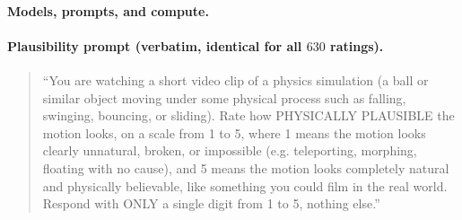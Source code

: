 \documentclass[10pt,twocolumn,letterpaper]{article}
\begin{document}
\paragraph{Models, prompts, and compute.}
\begin{table}[t]
\centering
\small
\setlength{\tabcolsep}{5pt}
\renewcommand{\arraystretch}{1.1}
\caption{Every model used, all frozen and inference-only, loaded with no
explicit commit/revision pin -- each resolved to that repository's
default-branch head at run time, a gap against bit-for-bit
reproducibility we disclose rather than paper over.
\textsuperscript{a}Free for academic/research use; commercial use needs
separate registration. \textsuperscript{b}Weights are
research/non-commercial; the companion code repo is separately
Apache-2.0 (inference here uses the weights). \textsuperscript{c}Non-commercial;
some unused sub-components carry MIT or Apache 2.0 instead.}
\end{table}

\paragraph{Plausibility prompt (verbatim, identical for all $630$ ratings).}
\begin{quote}\small
``You are watching a short video clip of a physics simulation (a ball or
similar object moving under some physical process such as falling,
swinging, bouncing, or sliding). Rate how PHYSICALLY PLAUSIBLE the motion
looks, on a scale from 1 to 5, where 1 means the motion looks clearly
unnatural, broken, or impossible (e.g. teleporting, morphing, floating
with no cause), and 5 means the motion looks completely natural and
physically believable, like something you could film in the real world.
Respond with ONLY a single digit from 1 to 5, nothing else.''
\end{quote}
\end{document}

